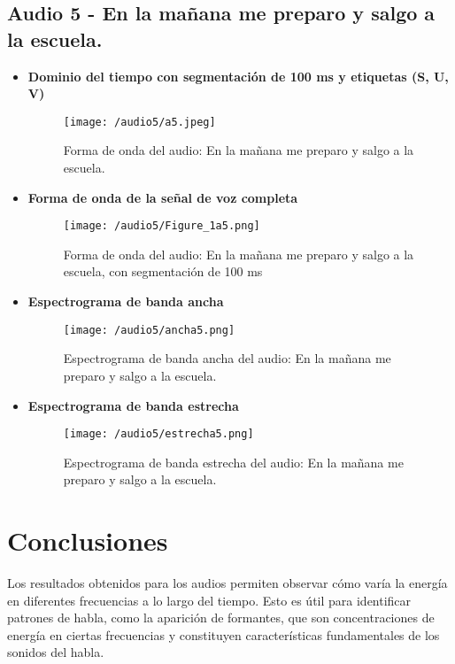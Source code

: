 \documentclass{report}
\begin{document}
\subsection{Audio 5 - En la mañana me preparo y salgo a la escuela.}
\begin{itemize}
    \item \textbf{Dominio del tiempo con segmentación de 100 ms y etiquetas (S, U, V)}
    \begin{figure}[h]
        \centering
        \texttt{[image: /audio5/a5.jpeg]}
        \caption{Forma de onda del audio: En la mañana me preparo y salgo a la escuela.}
        \label{fig:forma_onda_audio5div}
    \end{figure}
    \item \textbf{Forma de onda de la señal de voz completa}
    \begin{figure}[h]
        \centering
        \texttt{[image: /audio5/Figure\_1a5.png]}
        \caption{Forma de onda del audio: En la mañana me preparo y salgo a la escuela, con segmentación de 100 ms}
        \label{fig:forma de onda_audio5}
    \end{figure}
    \newpage
    \item \textbf{Espectrograma de banda ancha}
    \begin{figure}[h]
        \centering
        \texttt{[image: /audio5/ancha5.png]}
        \caption{Espectrograma de banda ancha del audio: En la mañana me preparo y salgo a la escuela.}
        \label{fig:espectograma banda ancha audio5}
    \end{figure}
    \item \textbf{Espectrograma de banda estrecha}
    \begin{figure}[h]
        \centering
        \texttt{[image: /audio5/estrecha5.png]}
        \caption{Espectrograma de banda estrecha del audio: En la mañana me preparo y salgo a la escuela.}
        \label{fig:espectograma banda estrecha audio5}
    \end{figure}
\end{itemize}

\newpage
\section{Conclusiones}

Los resultados obtenidos para los audios permiten observar cómo varía la energía en diferentes frecuencias a lo largo del tiempo. Esto es útil para identificar patrones de habla, como la aparición de formantes, que son concentraciones de energía en ciertas frecuencias y constituyen características fundamentales de los sonidos del habla.  
\end{document}
